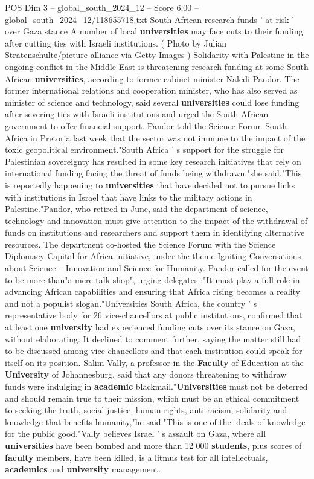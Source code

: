 \begin{textsample}{POS Dim 3 – global\_south\_2024\_12 – Score 6.00 – global\_south\_2024\_12/118655718.txt}  \label{ex:f3_pos_395}
South African research funds ' at risk ' over Gaza stance A number of local \textbf{universities} may face cuts to their funding after cutting ties with Israeli institutions. ( Photo by Julian Stratenschulte/picture alliance via Getty Images ) Solidarity with Palestine in the ongoing conflict in the Middle East is threatening research funding at some South African \textbf{universities}, according to former cabinet minister Naledi Pandor.
The former international relations and cooperation minister, who has also served as minister of science and technology, said several \textbf{universities} could lose funding after severing ties with Israeli institutions and urged the South African government to offer financial support.
Pandor told the Science Forum South Africa in Pretoria last week that the sector was not immune to the impact of the toxic geopolitical environment."South Africa ' s support for the struggle for Palestinian sovereignty has resulted in some key research initiatives that rely on international funding facing the threat of funds being withdrawn,"she said."This is reportedly happening to \textbf{universities} that have decided not to pursue links with institutions in Israel that have links to the military actions in Palestine."Pandor, who retired in June, said the department of science, technology and innovation must give attention to the impact of the withdrawal of funds on institutions and researchers and support them in identifying alternative resources.
The department co-hosted the Science Forum with the Science Diplomacy Capital for Africa initiative, under the theme Igniting Conversations about Science -- Innovation and Science for Humanity.
Pandor called for the event to be more than"a mere talk shop", urging delegates :"It must play a full role in advancing African capabilities and ensuring that Africa rising becomes a reality and not a populist slogan."Universities South Africa, the country ' s representative body for 26 vice-chancellors at public institutions, confirmed that at least one \textbf{university} had experienced funding cuts over its stance on Gaza, without elaborating.
It declined to comment further, saying the matter still had to be discussed among vice-chancellors and that each institution could speak for itself on its position.
Salim Vally, a professor in the \textbf{Faculty} of Education at the \textbf{University} of Johannesburg, said that any donors threatening to withdraw funds were indulging in \textbf{academic} blackmail."\textbf{Universities} must not be deterred and should remain true to their mission, which must be an ethical commitment to seeking the truth, social justice, human rights, anti-racism, solidarity and knowledge that benefits humanity,"he said."This is one of the ideals of knowledge for the public good."Vally believes Israel ' s assault on Gaza, where all \textbf{universities} have been bombed and more than 12 000 \textbf{students}, plus scores of \textbf{faculty} members, have been killed, is a litmus test for all intellectuals, \textbf{academics} and \textbf{university} management.

\end{textsample}
